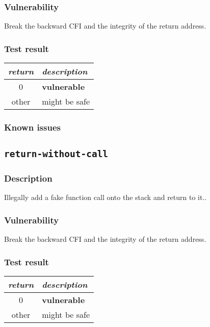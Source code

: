 \documentclass[a4paper]{book}
\begin{document}
\subsubsection{Vulnerability}
Break the backward CFI and the integrity of the return address.

\subsubsection{Test result}
\begin{tabular}{cl}
  \toprule
  \emph{return}  & \emph{description} \\
  \midrule
  0              & \textbf{vulnerable} \\
  other          & might be safe \\
  \bottomrule
\end{tabular}
  
\subsubsection{Known issues}


\newpage

\subsection{\texttt{return-without-call}}\label{test-return-without-call}

\subsubsection{Description}
Illegally add a fake function call onto the stack and return to it..

\subsubsection{Vulnerability}
Break the backward CFI and the integrity of the return address.

\subsubsection{Test result}
\begin{tabular}{cl}
  \toprule
  \emph{return}  & \emph{description} \\
  \midrule
  0              & \textbf{vulnerable} \\
  other          & might be safe \\
  \bottomrule
\end{tabular}
  
\end{document}
